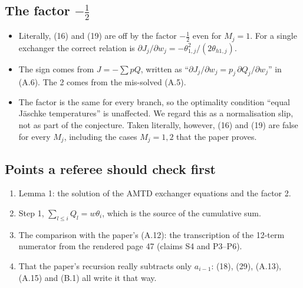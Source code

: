 \documentclass[11pt,a4paper]{report}
\begin{document}
\subsection{\texorpdfstring{The factor \(-\tfrac12\)}{The factor -1/2}}\label{sec:half}

\begin{itemize}
\item Literally, (16) and (19) are off by the factor \(-\tfrac12\) even for \(M_j = 1\). For a single exchanger the
correct relation is \(\partial J_j/\partial w_j = -\theta_{1,j}^2/(2\theta_{h1,j})\).
\item The sign comes from \(J = -\sum pQ\), written as ``\(\partial J_j/\partial w_j = p_j\,\partial Q_j/\partial w_j\)''
in (A.6). The 2 comes from the mis-solved (A.5).
\item The factor is the same for every branch, so the optimality condition ``equal Jäschke temperatures'' is unaffected.
We regard this as a normalisation slip, not as part of the conjecture. Taken literally, however, (16) and (19) are false
for every \(M_j\), including the cases \(M_j = 1, 2\) that the paper proves.
\end{itemize}

\subsection{Points a referee should check first}

\begin{enumerate}
\item Lemma 1: the solution of the AMTD exchanger equations and the factor 2.
\item Step 1, \(\sum_{l\le i} Q_l = w\theta_i\), which is the source of the cumulative sum.
\item The comparison with the paper's (A.12): the transcription of the 12-term numerator from the rendered page 47
(claims S4 and P3--P6).
\item That the paper's recursion really subtracts only \(a_{i-1}\): (18), (29), (A.13), (A.15) and (B.1) all write it
that way.
\end{enumerate}

\paperreferences
\end{document}
